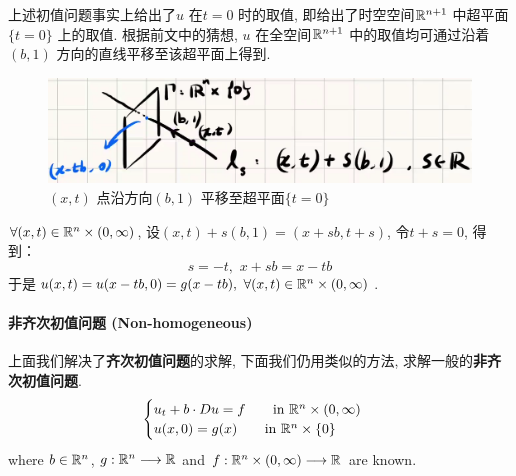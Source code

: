 	\vspace*{2em}
	
	\begin{rmk}
		上述初值问题事实上给出了$u$ 在$t = 0$ 时的取值, 即给出了时空空间$\mathbb{R}^{n + 1}$ 中超平面$\{ t = 0 \}$ 上的取值. 根据前文中的猜想, $u$ 在全空间$\mathbb{R}^{n + 1}$ 中的取值均可通过沿着$(b , 1)$ 方向的直线平移至该超平面上得到.
	\end{rmk}
	
	\begin{figure}[thbp!]
		\centering
		\includegraphics[width=0.7\linewidth]{figure/1.7.2-1}
		\caption{$(x , t)$ 点沿方向$(b , 1)$ 平移至超平面$\{ t = 0 \}$}
		\label{pic : 1.7.2-1} %
	\end{figure}
	
	$\forall (x , t) \in \mathbb{R}^n \times (0 , \infty)$, 设$(x , t) + s(b , 1) = (x + sb , t + s)$, 令$t + s = 0$, 得到：
	\[ s = -t , \,\, x + sb = x - tb \]
	于是$u(x , t) = u(x - tb , 0) = g(x - tb) , \,\, \forall (x , t) \in \mathbb{R}^n \times (0 , \infty)$.
	
\newpage
\paragraph{非齐次初值问题 (Non-homogeneous)}
	上面我们解决了\textbf{齐次初值问题}的求解, 下面我们仍用类似的方法, 求解一般的\textbf{非齐次初值问题}.
	\begin{align}
		\begin{cases}
			u_t + b \cdot Du = f \hspace*{2em} \text{in} \,\, \mathbb{R}^n \times (0 , \infty) \\
			u(x , 0) = g(x) \hspace*{2em} \text{in} \,\, \mathbb{R}^n \times \{ 0 \}
		\end{cases}
	\end{align}
	where $b \in \mathbb{R}^n$, $g : \mathbb{R}^n \longrightarrow \mathbb{R}$ and $f : \mathbb{R}^n \times (0 , \infty) \longrightarrow \mathbb{R}$ are known. 
	
	\vspace*{6em}
	
